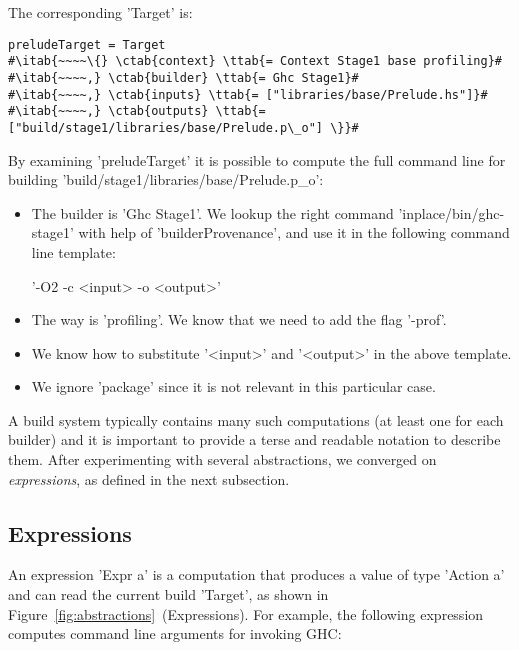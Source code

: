 \noindent The corresponding \lst'Target' is:

\begin{lstlisting}
preludeTarget = Target
#\itab{~~~~\{} \ctab{context} \ttab{= Context Stage1 base profiling}#
#\itab{~~~~,} \ctab{builder} \ttab{= Ghc Stage1}#
#\itab{~~~~,} \ctab{inputs} \ttab{= ["libraries/base/Prelude.hs"]}#
#\itab{~~~~,} \ctab{outputs} \ttab{= ["build/stage1/libraries/base/Prelude.p\_o"] \}}#
\end{lstlisting}

\noindent By examining \lst'preludeTarget' it is possible to compute the full
command line for building \lst'build/stage1/libraries/base/Prelude.p_o':
\begin{itemize}
  \item The builder is \lst'Ghc Stage1'. We lookup the right command
  \lst'inplace/bin/ghc-stage1' with help of \lst'builderProvenance', and use it
  in the following command line template:\vspace{1mm}\\
  \centerline{\!\!\!\!\!\lst'-O2 -c <input> -o <output>'}
  \item The way is \lst'profiling'. We know that we need to add the
  flag \lst'-prof'.$\!\!\!$
  \item We know how to substitute \lst'<input>' and \lst'<output>' in the
  above template.
  \item We ignore \lst'package' since it is not relevant in this particular
  case.
\end{itemize}

\noindent A build system typically contains many such computations (at least one
for each builder) and it is important to provide a terse and readable notation to
describe them. After experimenting with several abstractions, we converged on
\emph{expressions}, as defined in the next subsection.

\subsection{Expressions\label{sec:expressions}}

An expression \lst'Expr a' is a computation that produces a value of type
\lst'Action a' and can read the current build \lst'Target', as shown in
Figure~\ref{fig:abstractions}~(Expressions). For example,
the following expression computes command line arguments for invoking GHC:

\newcommand{\altab}[1]{\hspace{.05\textwidth}\rlap{#1}}

